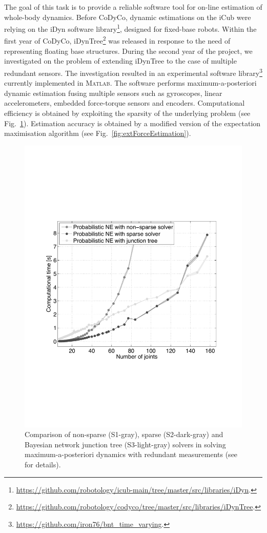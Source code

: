 The goal of this task is to provide a reliable software tool for on-line
estimation of whole-body dynamics.  Before CoDyCo, dynamic estimations on the
iCub were relying on the iDyn software
library\footnote{\url{https://github.com/robotology/icub-main/tree/master/src/libraries/iDyn}.},
designed for fixed-base robots.  Within the first year of CoDyCo,
iDynTree\footnote{{\url{https://github.com/robotology/codyco/tree/master/src/libraries/iDynTree}}.}
was released in response to the need of representing floating base structures.
During the second year of the project, we investigated on the problem of
extending iDynTree to the case of multiple redundant sensors.  The
investigation resulted in an experimental software
library\footnote{\url{https://github.com/iron76/bnt_time_varying}.} currently
implemented in \textsc{Matlab}.  The software performs maximum-a-posteriori
dynamic estimation fusing multiple sensors such as gyroscopes, linear
accelerometers, embedded force-torque sensors and encoders.  Computational
efficiency is obtained by exploiting the sparsity of the underlying problem
\cite{Nori2015} (see Fig.~\ref{fig:varTimeComplete}).  Estimation accuracy is
obtained by a modified version of the expectation maximisation algorithm
\cite{Nori2015b} (see Fig.~\ref{fig:extForceEstimation}).

\begin{figure}
   \centering
   \includegraphics[height=0.35\hsize]{images/varTimeComplete.pdf}
   \caption{\label{fig:varTimeComplete} Comparison of non-sparse (S1-gray),
   sparse (S2-dark-gray) and Bayesian network junction tree (S3-light-gray)
   solvers in solving maximum-a-posteriori dynamics with redundant
   measurements (see \cite{Nori2015} for details).}
\end{figure}

